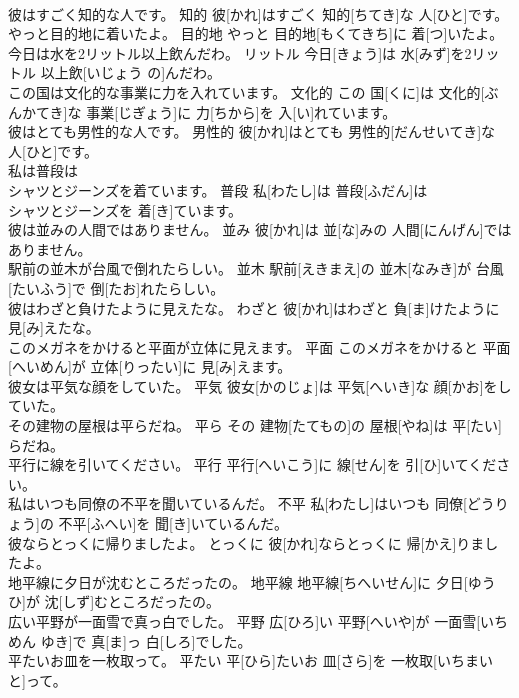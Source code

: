 \documentclass[8pt]{extreport}
\begin{document}
\begin{CJK}{UTF8}{min}
\\	彼はすごく知的な人です。	知的	彼[かれ]はすごく 知的[ちてき]な 人[ひと]です。	
\\	やっと目的地に着いたよ。	目的地	やっと 目的地[もくてきち]に 着[つ]いたよ。	
\\	今日は水を2リットル以上飲んだわ。	リットル	今日[きょう]は 水[みず]を2リットル 以上飲[いじょう の]んだわ。	
\\	この国は文化的な事業に力を入れています。	文化的	この 国[くに]は 文化的[ぶんかてき]な 事業[じぎょう]に 力[ちから]を 入[い]れています。	
\\	彼はとても男性的な人です。	男性的	彼[かれ]はとても 男性的[だんせいてき]な 人[ひと]です。	
\\	私は普段は
\\	シャツとジーンズを着ています。	普段	私[わたし]は 普段[ふだん]は 
\\	[てぃー]シャツとジーンズを 着[き]ています。	
\\	彼は並みの人間ではありません。	並み	彼[かれ]は 並[な]みの 人間[にんげん]ではありません。	
\\	駅前の並木が台風で倒れたらしい。	並木	駅前[えきまえ]の 並木[なみき]が 台風[たいふう]で 倒[たお]れたらしい。	
\\	彼はわざと負けたように見えたな。	わざと	彼[かれ]はわざと 負[ま]けたように 見[み]えたな。	
\\	このメガネをかけると平面が立体に見えます。	平面	このメガネをかけると 平面[へいめん]が 立体[りったい]に 見[み]えます。	
\\	彼女は平気な顔をしていた。	平気	彼女[かのじょ]は 平気[へいき]な 顔[かお]をしていた。	
\\	その建物の屋根は平らだね。	平ら	その 建物[たてもの]の 屋根[やね]は 平[たい]らだね。	
\\	平行に線を引いてください。	平行	平行[へいこう]に 線[せん]を 引[ひ]いてください。	
\\	私はいつも同僚の不平を聞いているんだ。	不平	私[わたし]はいつも 同僚[どうりょう]の 不平[ふへい]を 聞[き]いているんだ。	
\\	彼ならとっくに帰りましたよ。	とっくに	彼[かれ]ならとっくに 帰[かえ]りましたよ。	
\\	地平線に夕日が沈むところだったの。	地平線	地平線[ちへいせん]に 夕日[ゆうひ]が 沈[しず]むところだったの。	
\\	広い平野が一面雪で真っ白でした。	平野	広[ひろ]い 平野[へいや]が 一面雪[いちめん ゆき]で 真[ま]っ 白[しろ]でした。	
\\	平たいお皿を一枚取って。	平たい	平[ひら]たいお 皿[さら]を 一枚取[いちまい と]って。	

\end{CJK}
\end{document}
